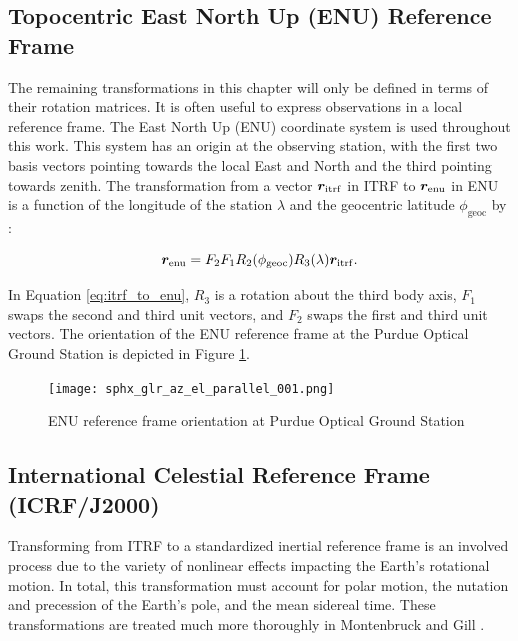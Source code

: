 \subsection{Topocentric East North Up (ENU) Reference Frame}

The remaining transformations in this chapter will only be defined in terms of their rotation matrices. It is often useful to express observations in a local reference frame. The East North Up (ENU) coordinate system is used throughout this work. This system has an origin at the observing station, with the first two basis vectors pointing towards the local East and North and the third pointing towards zenith. The transformation from a vector $\bm{r}_\mathrm{itrf}$ in ITRF to $\bm{r}_\mathrm{enu}$ in ENU is a function of the longitude of the station $\lambda$ and the geocentric latitude $\phi_\mathrm{geoc}$ by \cite{frueh2019notes}:

\begin{equation} \label{eq:itrf_to_enu}
  \bm{r}_\mathrm{enu} = F_2 F_1 R_2(\phi_\mathrm{geoc}) R_3(\lambda) \bm{r}_\mathrm{itrf}.
\end{equation}

In Equation \ref{eq:itrf_to_enu}, $R_3$ is a rotation about the third body axis, $F_1$ swaps the second and third unit vectors, and $F_2$ swaps the first and third unit vectors. The orientation of the ENU reference frame at the Purdue Optical Ground Station is depicted in Figure \ref{fig:pogs_enu}.

\begin{figure}[ht]
  \centering
  \texttt{[image: sphx\_glr\_az\_el\_parallel\_001.png]}
  \caption{ENU reference frame orientation at Purdue Optical Ground Station}
  \label{fig:pogs_enu}
\end{figure}

\subsection{International Celestial Reference Frame (ICRF/J2000)} \label{sec:teme}

Transforming from ITRF to a standardized inertial reference frame is an involved process due to the variety of nonlinear effects impacting the Earth's rotational motion. In total, this transformation must account for polar motion, the nutation and precession of the Earth's pole, and the mean sidereal time. These transformations are treated much more thoroughly in Montenbruck and Gill \cite{montenbruck2012}. 

